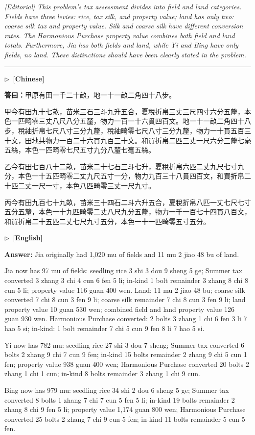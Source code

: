 \documentclass[10pt,a4paper]{article}
\newcommand{\longline}{\par\noindent\rule{\textwidth}{0.4pt}\par}
\newcommand{\CNmarker}{\noindent\textcolor{cnlabel}{$\triangleright$\ \textbf{[Chinese]}}\par}
\newcommand{\ENmarker}{\noindent\textcolor{enlabel}{$\triangleright$\ \textbf{[English]}}\par}
\newcommand{\Answer}[1]{\par\noindent\textbf{\color{answercolor}答曰：}#1\par}
\newcommand{\AnswerEn}[1]{\par\noindent\textbf{\color{answercolor}Answer:} #1\par}
\newcommand{\EditorialNoteEn}[1]{\par\noindent\textit{[Editorial] #1}\par}
\begin{document}
\EditorialNoteEn{This problem's tax assessment divides into field and land categories. Fields have three levies: rice, tax silk, and property value; land has only two: coarse silk tax and property value. Silk and coarse silk have different conversion rates. The Harmonious Purchase property value combines both field and land totals. Furthermore, Jia has both fields and land, while Yi and Bing have only fields, no land. These distinctions should have been clearly stated in the problem.}

\longline

\CNmarker
\Answer{甲原有田一千二十畝，地一十一畝二角四十八步。

甲今有田九十七畝，苗米三石三斗九升五合，夏稅折帛三丈三尺四寸六分五釐，本色一匹畸零三丈八尺八分五釐，物力一百一十六貫四百文。地一十一畝二角四十八步，稅紬折帛七尺八寸三分九釐，稅紬畸零七尺八寸三分九釐，物力一十貫五百三十文，田地共物力一百二十六貫九百三十文。和買折帛二匹三丈一尺六分三釐七毫五絲，本色一匹畸零七尺五寸九分八釐七毫五絲。

乙今有田七百八十二畝，苗米二十七石三斗七升，夏稅折帛六匹二丈九尺七寸九分，本色一十五匹畸零二丈九尺五寸一分，物力九百三十八貫四百文，和買折帛二十匹二丈一尺一寸，本色八匹畸零三丈一尺九寸。

丙今有田九百七十九畝，苗米三十四石二斗六升五合，夏稅折帛八匹一丈七尺七寸五分五釐，本色一十九匹畸零二丈八尺九分五釐，物力一千一百七十四貫八百文，和買折帛二十五匹二丈七尺九寸五分，本色一十一匹畸零五寸五分。}

\ENmarker
\AnswerEn{Jia originally had 1,020 mu of fields and 11 mu 2 jiao 48 bu of land.

Jia now has 97 mu of fields: seedling rice 3 shi 3 dou 9 sheng 5 ge; Summer tax converted 3 zhang 3 chi 4 cun 6 fen 5 li; in-kind 1 bolt remainder 3 zhang 8 chi 8 cun 5 li; property value 116 guan 400 wen. Land: 11 mu 2 jiao 48 bu; coarse silk converted 7 chi 8 cun 3 fen 9 li; coarse silk remainder 7 chi 8 cun 3 fen 9 li; land property value 10 guan 530 wen; combined field and land property value 126 guan 930 wen. Harmonious Purchase converted: 2 bolts 3 zhang 1 chi 6 fen 3 li 7 hao 5 si; in-kind: 1 bolt remainder 7 chi 5 cun 9 fen 8 li 7 hao 5 si.

Yi now has 782 mu: seedling rice 27 shi 3 dou 7 sheng; Summer tax converted 6 bolts 2 zhang 9 chi 7 cun 9 fen; in-kind 15 bolts remainder 2 zhang 9 chi 5 cun 1 fen; property value 938 guan 400 wen; Harmonious Purchase converted 20 bolts 2 zhang 1 chi 1 cun; in-kind 8 bolts remainder 3 zhang 1 chi 9 cun.

Bing now has 979 mu: seedling rice 34 shi 2 dou 6 sheng 5 ge; Summer tax converted 8 bolts 1 zhang 7 chi 7 cun 5 fen 5 li; in-kind 19 bolts remainder 2 zhang 8 chi 9 fen 5 li; property value 1,174 guan 800 wen; Harmonious Purchase converted 25 bolts 2 zhang 7 chi 9 cun 5 fen; in-kind 11 bolts remainder 5 cun 5 fen.}
\end{document}
